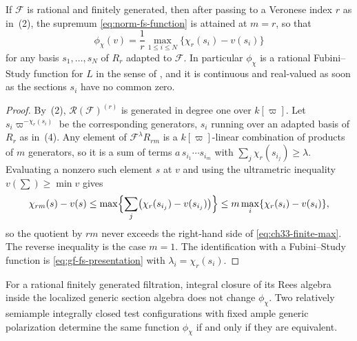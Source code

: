 \begin{corollary}\label{cor:ch33-fg-finite-max}
If $\mathcal F$ is rational and finitely generated, then after passing to
a Veronese index $r$ as in \,(2), the
supremum \eqref{eq:norm-fs-function} is attained at $m=r$, so that
\begin{equation}
\label{eq:ch33-finite-max}
 \phi_\chi(v)
 =\frac1r\max_{1\leq i\leq N}\{\chi_r(s_i)-v(s_i)\}
\end{equation}
for any basis $s_1,\dots,s_N$ of $R_r$ adapted to $\mathcal F$.  In
particular $\phi_\chi$ is a rational Fubini--Study function for $L$ in
the sense of , and it is continuous and
real-valued as soon as the sections $s_i$ have no common zero.
\end{corollary}

\begin{proof}
By \,(2), $\mathcal R(\mathcal F)^{(r)}$
is generated in degree one over $k[\varpi]$.  Let
$s_i\varpi^{-\chi_r(s_i)}$ be the corresponding generators, $s_i$
running over an adapted basis of $R_r$ as in
\,(4).  Any element of
$\mathcal F^\lambda R_{rm}$ is a $k[\varpi]$-linear combination of
products of $m$ generators, so it is a sum of terms
$a\,s_{i_1}\cdots s_{i_m}$ with
$\sum_j\chi_r(s_{i_j})\geq\lambda$.  Evaluating a nonzero such element
$s$ at $v$ and using the ultrametric inequality
$v(\sum)\geq\min v$ gives
\[
 \chi_{rm}(s)-v(s)
 \leq\max\Bigl\{\sum_j\bigl(\chi_r(s_{i_j})-v(s_{i_j})\bigr)\Bigr\}
 \leq m\max_i\{\chi_r(s_i)-v(s_i)\},
\]
so the quotient by $rm$ never exceeds the right-hand side of
\eqref{eq:ch33-finite-max}.  The reverse inequality is the case $m=1$.
The identification with a Fubini--Study function is
\eqref{eq:gf-fs-presentation} with $\lambda_i=\chi_r(s_i)$.
\end{proof}

\begin{proposition}\label{prop:tc-valuative-invariance}
For a rational finitely generated filtration, integral closure of its
Rees algebra inside the localized generic section algebra does not change
$\phi_\chi$.  Two relatively semiample integrally closed test configurations
with fixed ample generic polarization determine the same function
$\phi_\chi$ if and only if they are equivalent.
\end{proposition}

